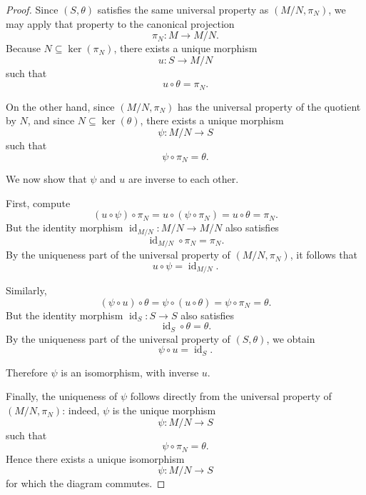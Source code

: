 \begin{proof}
    Since $(S,\theta)$ satisfies the same universal property as $(M/N,\pi_N)$, we may apply that property to the canonical projection
    \[
        \pi_N : M \to M/N.
    \]
    Because $N \subseteq \ker(\pi_N)$, there exists a unique morphism
    \[
        u:S\to M/N
    \]
    such that
    \[
        u\circ \theta=\pi_N.
    \]

    On the other hand, since $(M/N,\pi_N)$ has the universal property of the quotient by $N$, and since $N \subseteq \ker(\theta)$, there exists a unique morphism
    \[
        \psi:M/N\to S
    \]
    such that
    \[
        \psi\circ \pi_N=\theta.
    \]

    We now show that $\psi$ and $u$ are inverse to each other.

    First, compute
    \[
        (u\circ \psi)\circ \pi_N
        = u\circ (\psi\circ \pi_N)
        = u\circ \theta
        = \pi_N.
    \]
    But the identity morphism $\operatorname{id}_{M/N}:M/N\to M/N$ also satisfies
    \[
        \operatorname{id}_{M/N}\circ \pi_N=\pi_N.
    \]
    By the uniqueness part of the universal property of $(M/N,\pi_N)$, it follows that
    \[
        u\circ \psi=\operatorname{id}_{M/N}.
    \]

    Similarly,
    \[
        (\psi\circ u)\circ \theta
        = \psi\circ (u\circ \theta)
        = \psi\circ \pi_N
        = \theta.
    \]
    But the identity morphism $\operatorname{id}_S:S\to S$ also satisfies
    \[
        \operatorname{id}_S\circ \theta=\theta.
    \]
    By the uniqueness part of the universal property of $(S,\theta)$, we obtain
    \[
        \psi\circ u=\operatorname{id}_S.
    \]

    Therefore $\psi$ is an isomorphism, with inverse $u$.

    Finally, the uniqueness of $\psi$ follows directly from the universal property of $(M/N,\pi_N)$: indeed, $\psi$ is the unique morphism
    \[
        \psi:M/N\to S
    \]
    such that
    \[
        \psi\circ \pi_N=\theta.
    \]
    Hence there exists a unique isomorphism
    \[
        \psi:M/N\to S
    \]
    for which the diagram commutes.
\end{proof}

